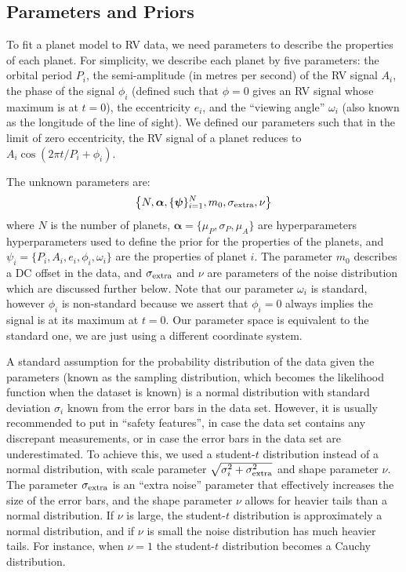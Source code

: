 \documentclass[useAMS,usenatbib]{mn2e}
\begin{document}
\subsection{Parameters and Priors}
To fit a planet model to RV data, we need parameters to describe
the properties of each planet. For simplicity, we describe each planet by
five parameters: the orbital period $P_i$, the semi-amplitude (in metres
per second) of the RV signal $A_i$, the phase of the signal
$\phi_i$ (defined such that $\phi=0$ gives an RV signal whose maximum is at
$t=0$), the eccentricity $e_i$, and the ``viewing angle'' $\omega_i$
(also known as the longitude of the line of sight). We defined our parameters
such that in the limit of zero eccentricity, the RV signal of a planet
reduces to $A_i\cos\left(2\pi t/P_i + \phi_i\right)$.

The unknown parameters are:
\begin{eqnarray}
\left\{N, \boldsymbol{\alpha}, \{\boldsymbol{\psi}\}_{i=1}^N, m_0,
\sigma_{\rm extra}, \nu\right\}
\end{eqnarray}
where $N$ is the number of planets,
$\boldsymbol{\alpha} = \{\mu_P, \sigma_P, \mu_A\}$ are hyperparameters
hyperparameters used to define the prior for the properties of the planets,
and $\psi_i = \{P_i, A_i, e_i, \phi_i, \omega_i\}$
are the properties of planet $i$.
The parameter $m_0$ describes a DC offset in the data, and
$\sigma_{\rm extra}$ and $\nu$ are parameters of the noise distribution
which are discussed further below. Note that our parameter $\omega_i$ is
standard, however $\phi_i$ is non-standard because we assert that $\phi_i=0$
always implies the signal is at its maximum at $t=0$. Our parameter space is
equivalent to the standard one, we are just using a different coordinate system.

A standard assumption for the probability distribution of the data given the
parameters (known as the sampling distribution, which becomes the likelihood
function when the dataset is known) is a normal distribution with
standard deviation $\sigma_i$ known from the error bars in the data set.
However, it is usually recommended to put in ``safety features'', in case the
data set contains any discrepant measurements, or in case the error bars in the
data set are underestimated. To achieve this, we used a student-$t$ distribution
instead of a normal distribution, with
scale parameter $\sqrt{\sigma_i^2 + \sigma_{\rm extra}^2}$ and shape parameter $\nu$. The
parameter $\sigma_{\rm extra}$ is an ``extra noise'' parameter that effectively increases the
size of the error bars, and the shape parameter $\nu$ allows for heavier tails
than a normal distribution. If $\nu$ is large, the student-$t$ distribution
is approximately a normal distribution, and if $\nu$ is small the noise
distribution has much heavier tails. For instance, when $\nu=1$ the student-$t$
distribution becomes a Cauchy distribution.
\end{document}
